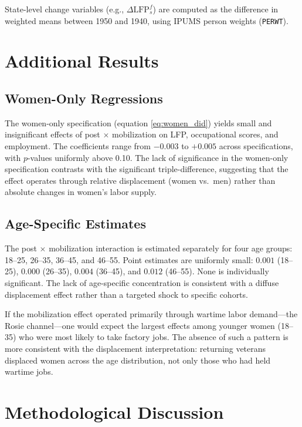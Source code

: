 \documentclass[12pt]{article}
\begin{document}
State-level change variables (e.g., $\Delta \text{LFP}^f_s$) are computed as the difference in weighted means between 1950 and 1940, using IPUMS person weights (\texttt{PERWT}).


\section{Additional Results}
\label{app:results}

\subsection{Women-Only Regressions}

The women-only specification (equation \ref{eq:women_did}) yields small and insignificant effects of post $\times$ mobilization on LFP, occupational scores, and employment. The coefficients range from $-0.003$ to $+0.005$ across specifications, with $p$-values uniformly above 0.10. The lack of significance in the women-only specification contrasts with the significant triple-difference, suggesting that the effect operates through relative displacement (women vs.\ men) rather than absolute changes in women's labor supply.

\subsection{Age-Specific Estimates}

The post $\times$ mobilization interaction is estimated separately for four age groups: 18--25, 26--35, 36--45, and 46--55. Point estimates are uniformly small: $0.001$ (18--25), $0.000$ (26--35), $0.004$ (36--45), and $0.012$ (46--55). None is individually significant. The lack of age-specific concentration is consistent with a diffuse displacement effect rather than a targeted shock to specific cohorts.

If the mobilization effect operated primarily through wartime labor demand---the Rosie channel---one would expect the largest effects among younger women (18--35) who were most likely to take factory jobs. The absence of such a pattern is more consistent with the displacement interpretation: returning veterans displaced women across the age distribution, not only those who had held wartime jobs.


\section{Methodological Discussion}
\label{app:methods}
\end{document}
